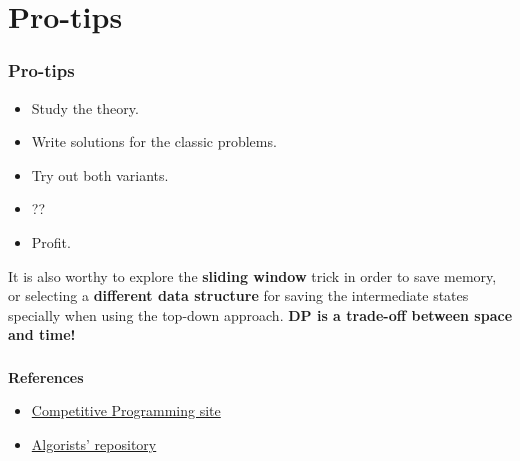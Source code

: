 \documentclass[article]{beamer}
\begin{document}
\section{Pro-tips}
\begin{frame}
	\frametitle{Pro-tips}
	\begin{itemize}
		\item Study the theory.
		\item Write solutions for the classic problems.
		\item Try out both variants.
		\item ??
		\item Profit.
	\end{itemize}
	
	\vspace{5mm}
	
	It is also worthy to explore the \textbf{sliding window} trick in order to save memory, or selecting a \textbf{different data structure} for saving the intermediate states specially when using the top-down approach. \textbf{DP is a trade-off between space and time!}
\end{frame}

\begin{frame}[plain]
\frametitle{}
\begin{center}
\Huge{\color{blue}{Q \& A}}
\end{center}
\end{frame}

\begin{frame}[plain]
	\textbf{References}
	\begin{itemize}
		\item \href{https://sites.google.com/site/stevenhalim/}{Competitive Programming site}
		\item \href{https://github.com/davidjacobo/algorists/}{Algorists' repository}
	\end{itemize}
\end{frame}
\end{document}
